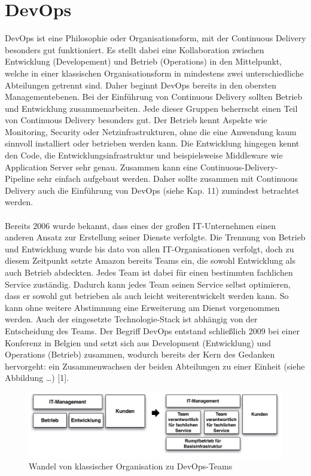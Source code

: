 \section{DevOps}
DevOps ist eine Philosophie oder Organisationsform, mit der Continuous Delivery besonders gut funktioniert. Es stellt dabei eine Kollaboration zwischen Entwicklung (Developement) und Betrieb (Operations) in den Mittelpunkt, welche in einer klassischen Organisationsform in mindestens zwei unterschiedliche Abteilungen getrennt sind. Daher beginnt DevOps bereits in den obersten Managementebenen. 
Bei der Einführung von Continuous Delivery sollten Betrieb und Entwicklung zusammenarbeiten. Jede dieser Gruppen beherrscht einen Teil von Continuous Delivery besonders gut. Der Betrieb kennt Aspekte wie Monitoring, Security oder Netzinfrastrukturen, ohne die eine Anwendung kaum sinnvoll installiert oder betrieben werden kann. Die Entwicklung hingegen kennt den Code, die Entwicklungsinfrastruktur und beispielsweise Middleware wie Application Server sehr genau. Zusammen kann eine Continuous-Delivery-Pipeline sehr einfach aufgebaut werden. Daher sollte zusammen mit Continuous Delivery auch die Einführung von DevOps (siehe Kap. 11) zumindest betrachtet werden.\\ \\
Bereits 2006 wurde bekannt, dass eines der großen IT-Unternehmen einen anderen Ansatz zur Erstellung seiner Dienste verfolgte. Die Trennung von Betrieb und Entwicklung wurde bis dato von allen IT-Organisationen verfolgt, doch zu diesem Zeitpunkt setzte Amazon bereits Teams ein, die sowohl Entwicklung als auch Betrieb abdeckten. Jedes Team ist dabei für einen bestimmten fachlichen Service zuständig. Dadurch kann jedes Team seinen Service selbst optimieren, dass er sowohl gut betrieben als auch leicht weiterentwickelt werden kann. So kann ohne weitere Abstimmung eine Erweiterung am Dienst vorgenommen werden. Auch der eingesetzte Technologie-Stack ist abhängig von der Entscheidung des Teams. Der Begriff DevOps entstand schließlich 2009 bei einer Konferenz in Belgien und setzt sich aus Development (Entwicklung) und Operations (Betrieb) zusammen, wodurch bereits der Kern des Gedanken hervorgeht: ein Zusammenwachsen der beiden Abteilungen zu einer Einheit (siehe Abbildung …) [1]. \\
\begin{figure}[h!]
	\centering
	\includegraphics[width=0.8\linewidth]{images/devops}
	\caption{Wandel von klassischer Organisation zu DevOps-Teams} %
	\label{fig:cnn_structure}
\end{figure}
